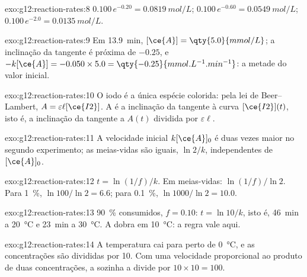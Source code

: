 \begin{solution}{exo:g12:reaction-rates:8}
$0.100\,e^{-0.20} = \qty{0.0819}{mol/L}$; $0.100\,e^{-0.60} =
\qty{0.0549}{mol/L}$; $0.100\,e^{-2.0} = \qty{0.0135}{mol/L}$.
\end{solution}

\begin{solution}{exo:g12:reaction-rates:9}
Em \qty{13.9}{min}, $[\ce{A}] = \qty{5.0}{mmol/L}$; a inclinação da
tangente é próxima de $-0.25$, e $-k[\ce{A}] = -0.050 \times 5.0 =
\qty{-0.25}{mmol.L^{-1}.min^{-1}}$: a metade do valor inicial.
\end{solution}

\begin{solution}{exo:g12:reaction-rates:10}
O iodo é a única espécie colorida: pela lei de Beer--Lambert,
$A = \varepsilon \ell [\ce{I2}]$. A  é a
inclinação da tangente à curva $[\ce{I2}](t)$, isto é, a inclinação da
tangente a $A(t)$ dividida por $\varepsilon \ell$.
\end{solution}

\begin{solution}{exo:g12:reaction-rates:11}
A velocidade inicial $k[\ce{A}]_0$ é duas vezes maior no segundo
experimento; as meias-vidas são iguais, $\ln 2 / k$, independentes de
$[\ce{A}]_0$.
\end{solution}

\begin{solution}{exo:g12:reaction-rates:12}
$t = \ln(1/f)/k$. Em meias-vidas: $\ln(1/f)/\ln 2$. Para
\qty{1}{\percent}, $\ln 100 / \ln 2 = 6.6$; para \qty{0.1}{\percent},
$\ln 1000 / \ln 2 =
10.0$.
\end{solution}

\begin{solution}{exo:g12:reaction-rates:13}
\qty{90}{\percent} consumidos, $f = 0.10$: $t = \ln 10 / k$, isto é,
\qty{46}{min} a \qty{20}{\celsius} e \qty{23}{min} a \qty{30}{\celsius}.
A  dobra em \qty{10}{\celsius}: a regra vale
aqui.
\end{solution}

\begin{solution}{exo:g12:reaction-rates:14}
A temperatura cai para perto de \qty{0}{\celsius}, e as concentrações
são divididas por 10. Com uma velocidade proporcional ao produto de duas
concentrações, a  sozinha a divide por $10 \times 10 = 100$.
\end{solution}

